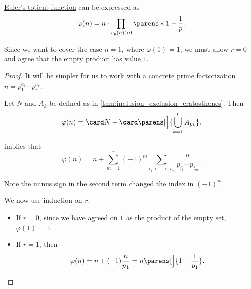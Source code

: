 \begin{theorem}\label{thm:totient_function_product_formula}
  \hyperref[def:eulers_totient_function]{Euler's totient function} can be expressed as
  \begin{equation}\label{eq:thm:totient_function_product_formula}
    \varphi(n) = n \cdot \prod_{v_p(n) > 0} \parens*{ 1 - \frac 1 p }.
  \end{equation}
\end{theorem}
\begin{comments}
  \item Since we want to cover the case \( n = 1 \), where \( \varphi(1) = 1 \), we must allow \( r = 0 \) and agree that the empty product has value \( 1 \).
\end{comments}
\begin{proof}
  It will be simpler for us to work with a concrete prime factorization \( n = p_1^{a_1} \cdots p_r^{a_r} \).

  Let \( N \) and \( A_k \) be defined as in \cref{thm:inclusion_exclusion_eratosthenes}. Then
  \begin{equation*}
    \varphi(n) = \card N - \card\parens[\Big]{ \bigcup_{k=1}^r A_{p_k} }.
  \end{equation*}

   implies that
  \begin{equation}\label{eq:thm:totient_function_product_formula/intermediate}
    \varphi(n) = n + \sum_{m=1}^r (-1)^m \sum_{i_1 < \cdots < i_m} \frac n {p_{i_1} \cdots p_{i_m}}.
  \end{equation}

  Note the minus sign in the second term changed the index in \( (-1)^m \).

  We now use induction on \( r \).
  \begin{itemize}
    \item If \( r = 0 \), since we have agreed on \( 1 \) as the product of the empty set, \( \varphi(1) = 1 \).
    \item If \( r = 1 \), then
    \begin{equation*}
      \varphi(n) = n + (-1) \frac n {p_1} = n \parens[\Big]{ 1 - \frac 1 {p_1} }.
    \end{equation*}


\end{itemize}
\end{proof}

